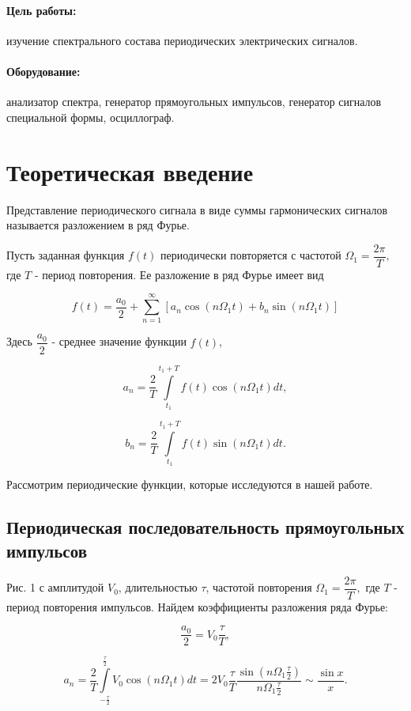 \documentclass[a4paper, 14pt]{extarticle}%
\date{}
\begin{document}
\maketitle
\paragraph*{Цель работы:} изучение спектрального состава периодических электрических сигналов.
	
\paragraph*{Оборудование:} анализатор спектра, генератор прямоугольных импульсов, генератор сигналов специальной формы, осциллограф.
	
\section{Теоретическая введение}
	
	Представление периодического сигнала в виде суммы гармонических сигналов называется разложением в ряд Фурье.
	
	Пусть заданная функция $f(t)$ периодически повторяется с частотой $\Omega_{1}=\dfrac{2\pi}{T},$ где $T$ - период повторения. Ее разложение в ряд Фурье имеет вид
	
	$$ f(t)=\dfrac{a_{0}}{2}+ \sum\limits_{n=1}^\infty [a_{n}\cos(n \Omega_{1}t)+b_{n}\sin(n \Omega_{1} t) ]$$
	
	Здесь $\dfrac{a_{0}}{2}$ - среднее значение функции $f(t)$,
	
	$$ a_{n}=\dfrac{2}{T}\int\limits_{t_{1}}^{t_{1}+T}f(t)\cos(n \Omega_{1} t)dt, $$
	
	$$ b_{n}=\dfrac{2}{T}\int\limits_{t_{1}}^{t_{1}+T}f(t)\sin(n \Omega_{1} t)dt. $$
	
	
	Рассмотрим периодические функции, которые исследуются в нашей
	работе.
	
		
	\subsection{Периодическая последовательность прямоугольных импульсов} 
	Рис. 1 с амплитудой $V_{0}$, длительностью $\tau$, частотой повторения $\Omega_{1}=\dfrac{2\pi}{T},$ где $T$ - период повторения импульсов. Найдем коэффициенты разложения ряда Фурье:
	
	$$\dfrac{a_{0}}{2}=V_{0}\dfrac{\tau}{T},$$
	
	$$a_{n}=\dfrac{2}{T}\int\limits_{-\frac{\tau}{2}}^{\frac{\tau}{2}}V_{0}\cos(n \Omega_{1} t)dt=2V_{0}\dfrac{\tau}{T}\dfrac{\sin(n \Omega_{1} \frac{\tau}{2})}{n\Omega_{1}\frac{\tau}{2}} \sim \dfrac{\sin x}{x}.$$
	
\end{document}
